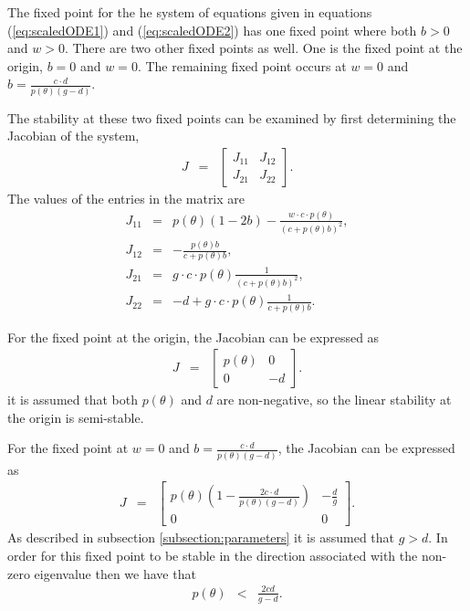 \documentclass[12pt]{article}
\begin{document}
The fixed point for the he system of equations given in equations
(\ref{eq:scaledODE1}) and (\ref{eq:scaledODE2}) has one fixed point
where both $b>0$ and $w>0$. There are two other fixed points as
well. One is the fixed point at the origin, $b=0$ and $w=0$.
The remaining fixed point occurs at $w=0$ and $b=\frac{c\cdot
  d}{p(\theta)\left(g - d\right)}$.

The stability at these two fixed points can be examined by first
determining the Jacobian of the system,
\begin{eqnarray*}
  J & = & \left[
          \begin{array}{rr}
            J_{11} & J_{12} \\
            J_{21} & J_{22}
          \end{array}
          \right].
\end{eqnarray*}
The values of the entries in the matrix are
\begin{eqnarray*}
  J_{11} & = & p(\theta)\left(1-2b\right) -
               \frac{w\cdot c \cdot p(\theta)}{\left( c + p(\theta)b \right)^2}, \\
  J_{12} & = & -\frac{p(\theta)b}{c+p(\theta)b}, \\
  J_{21} & = & g\cdot c \cdot  p(\theta) \frac{1}{\left(c+p(\theta)b\right)^2}, \\
  J_{22} & = & -d + g\cdot c \cdot  p(\theta) \frac{1}{c+p(\theta)b}.
\end{eqnarray*}

For the fixed point at the origin, the Jacobian can be expressed as 
\begin{eqnarray*}
  J & = & \left[
          \begin{array}{rr}
            p(\theta) & 0 \\
            0 & -d
          \end{array}
          \right].
\end{eqnarray*}
it is assumed that both $p(\theta)$ and $d$ are non-negative, so the
linear stability at the origin is semi-stable.

For the fixed point at $w=0$ and
$b=\frac{c\cdot d}{p(\theta)\left(g - d\right)}$, the Jacobian can be
expressed as 
\begin{eqnarray*}
  J & = & \left[
          \begin{array}{rr}
            p(\theta)\left( 1 -
            \frac{2c\cdot d}{p(\theta)(g-d)} \right) & -\frac{d}{g} \\
            0 & 0
          \end{array}
          \right].
\end{eqnarray*}
As described in subsection \ref{subsection:parameters} it is assumed
that $g>d$. In order for this fixed point to be stable in the
direction associated with the non-zero eigenvalue then we have that
\begin{eqnarray*}
  p(\theta) & < & \frac{2cd}{g-d}.
\end{eqnarray*}
\end{document}
